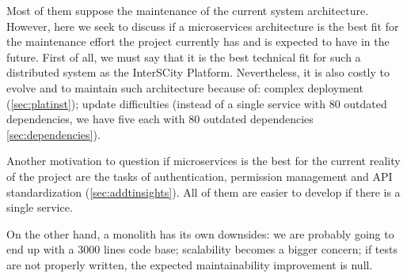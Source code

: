 \documentclass[paper=a4, fontsize=11pt]{scrartcl}
\numberwithin{equation}{section}    %
\numberwithin{figure}{section}      %
\numberwithin{table}{section}        %
\begin{document}
  Most of them suppose the maintenance of the current system architecture. However, here we seek to discuss if a microservices architecture is the best fit for the maintenance effort the project currently has and is expected to have in the future. First of all, we must say that it is the best technical fit for such a distributed system as the InterSCity Platform. Nevertheless, it is also costly to evolve and to maintain such architecture because of: complex deployment (\ref{sec:platinst}); update difficulties (instead of a single service with 80 outdated dependencies, we have five each with 80 outdated dependencies \ref{sec:dependencies}).

  Another motivation to question if microservices is the best for the current reality of the project are the tasks of authentication, permission management and API standardization (\ref{sec:addtinsights}). All of them are easier to develop if there is a single service.

  On the other hand, a monolith has its own downsides: we are probably going to end up with a 3000 lines code base; scalability becomes a bigger concern; if tests are not properly written, the expected maintainability improvement is null.
\end{document}
